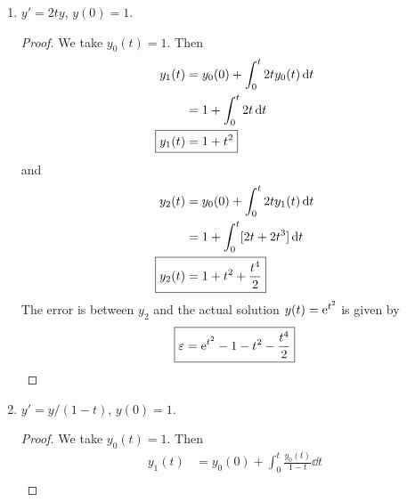 \documentclass[../psets.tex]{subfiles}
\begin{document}
\begin{enumerate}
\begin{enumerate}
\begin{proof}
\begin{align*}
                y_1(t) &= y_0(0)+\int_0^t[1+y_0(t)^2]\dd{t}\\
                &= \int_0^t[1+0]\dd{t}\\
                \Aboxed{y_1(t) &= t}
            \end{align*}
            and
            \begin{align*}
                y_2(t) &= y_0(0)+\int_0^t[1+y_1(t)^2]\dd{t}\\
                &= \int_0^t[1+t^2]\dd{t}\\
                \Aboxed{y_2(t) &= t+\frac{t^3}{3}}
            \end{align*}
            The error is between $y_2$ and the actual solution $y(t)=\tan(t)$ is given by
            \begin{equation*}
                \boxed{\varepsilon = \tan(t)-t-\frac{t^3}{3}}
            \end{equation*}
        \end{proof}
        \item $y'=2ty$, $y(0)=1$.
        \begin{proof}
            We take $y_0(t)=1$. Then
            \begin{align*}
                y_1(t) &= y_0(0)+\int_0^t2ty_0(t)\dd{t}\\
                &= 1+\int_0^t2t\dd{t}\\
                \Aboxed{y_1(t) &= 1+t^2}
            \end{align*}
            and
            \begin{align*}
                y_2(t) &= y_0(0)+\int_0^t2ty_1(t)\dd{t}\\
                &= 1+\int_0^t[2t+2t^3]\dd{t}\\
                \Aboxed{y_2(t) &= 1+t^2+\frac{t^4}{2}}
            \end{align*}
            The error is between $y_2$ and the actual solution $y(t)=\e[t^2]$ is given by
            \begin{equation*}
                \boxed{\varepsilon = \e[t^2]-1-t^2-\frac{t^4}{2}}
            \end{equation*}
        \end{proof}
        \item $y'=y/(1-t)$, $y(0)=1$.
        \begin{proof}
            We take $y_0(t)=1$. Then
            \begin{align*}
                y_1(t) &= y_0(0)+\int_0^t\frac{y_0(t)}{1-t}\dd{t}\\

\end{align*}
\end{proof}
\end{enumerate}
\end{enumerate}
\end{document}

